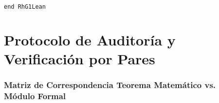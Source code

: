 \documentclass[11pt,a4paper]{article}
\theoremstyle{definition}
\theoremstyle{remark}
\begin{document}
\begin{lstlisting}[language=Lean4]
end RhG1Lean
\end{lstlisting}

\newpage

\part{Protocolo de Auditoría y Verificación por Pares}

\section{Matriz de Correspondencia Teorema Matemático vs. Módulo Formal}
\end{document}
